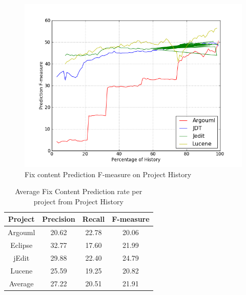 \documentclass[10pt, conference, letterpaper, compsocconf]{IEEEtran}
\newcommand{\todoc}[2]{{\textcolor{#1} {\textbf{[[#2]]}}}}
\newcommand{\todored}[1]{\todoc{red}  {\textbf{[[#1]]}}}
\newcommand{\sung}[1]{\todored{Sung: #1}}
\begin{document}
\begin{figure}[t]
\begin{center}
 \includegraphics[scale=0.35]{pictures/rq1.png}
\end{center}
\caption{Fix content Prediction F-measure on Project History}
\label{fix_content_machine}

\end{figure}




\begin{table}\centering
\caption{Average Fix Content Prediction rate per project from Project History}
\label{tab:AvgFeedback}
\begin{tabular}{|c|c|c|c|}
\hline
Project &  Precision &  Recall &  F-measure\\ 
\hline
Argouml &  20.62 &  22.78 &  20.06\\ 
\hline
Eclipse &  32.77 &  17.60 &  21.99\\ 
\hline
jEdit &  29.88 &  22.40 &  24.79\\ 
\hline
Lucene &  25.59 &  19.25 &  20.82\\ 
\hline
Average &  27.22 &  20.51 &  21.91\\ 
\hline
\end{tabular}

\end{table}
\end{document}
